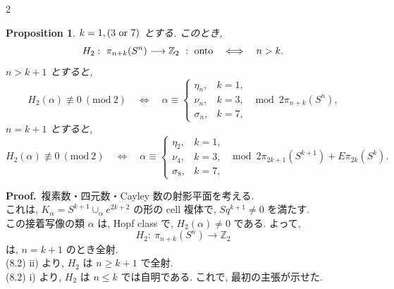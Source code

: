 \documentclass[10pt, leqno]{ltjsarticle}
\newcommand{\pis}[2]{\pi_{#1}(#2)}       %
\newcommand{\z}{\mathbb{Z}}
\numberwithin{equation}{section}
\theoremstyle{plain}
\newtheorem{proposition}[theorem]{Proposition}
\theoremstyle{definition}
\theoremstyle{remark}
\begin{document}
\begin{paracol}{2}

\begin{proposition}
\(k=1, (3 \textnormal{ or } 7)\) とする. 
このとき,
\[
H_2:\ \pis{n+k}{S^n}\longrightarrow \z_2 \ : \ \textnormal{onto}
\quad\Longleftrightarrow\quad
n > k.
\]
\(n>k+1\) とすると, 
\[
H_2(\alpha)\not\equiv 0\ (\mathrm{mod}\ 2)
\quad\Longleftrightarrow\quad
\alpha\equiv
\begin{cases}
\eta_n,& k=1,\\
\nu_n, & k=3,\\
\sigma_n,& k=7,
\end{cases}
\mod 2\pis{n+k}{S^n},
\]
\(n=k+1\) とすると, 
\[
H_2(\alpha)\not\equiv 0\ (\mathrm{mod}\ 2)
\quad\Longleftrightarrow\quad
\alpha\equiv
\begin{cases}
\eta_2,& k=1,\\
\nu_4, & k=3,\\
\sigma_8,& k=7,
\end{cases}
\mod 2\pis{2k+1}{S^{k+1}} + E\pis{2k}{S^k}.
\]
\end{proposition}




\noindent
\textbf{Proof.}\
複素数・四元数・Cayley 数の射影平面を考える. \\
これは, \(K_\alpha=S^{k+1}\cup_\alpha e^{2k+2}\) の形の cell 複体で, 
\(Sq^{k+1}\ne0\) を満たす. \\
この接着写像の類 \(\alpha\) は, Hopf class で, 
\(H_2(\alpha)\ne0\) である. 
よって,
\[
H_2:\ \pis{n+k}{S^n}\longrightarrow\z_2
\]
は, \(n=k+1\) のとき全射. \\
(8.2) ii) より,
\(H_2\) は \(n\ge k+1\) で全射.\\
(8.2) i) より,
\(H_2\) は \(n\le k\) では自明である. 
これで, 最初の主張が示せた. 


\end{paracol}
\end{document}
